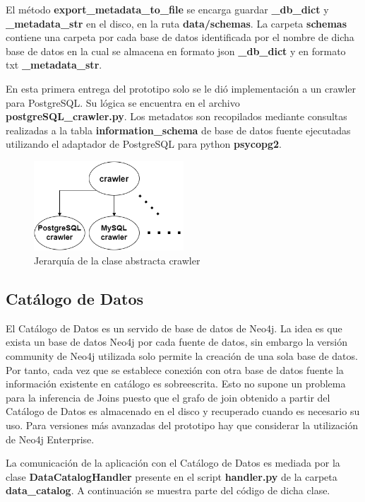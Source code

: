 El m\'etodo \textbf{export\_metadata\_to\_file} se encarga guardar \textbf{\_db\_dict} y \textbf{\_metadata\_str} en el disco, 
en la ruta \textbf{data/schemas}. La carpeta \textbf{schemas} contiene una carpeta por cada base de datos identificada 
por el nombre de dicha base de datos en la cual se almacena en formato json \textbf{\_db\_dict} y en formato txt 
\textbf{\_metadata\_str}.

En esta primera entrega del prototipo solo se le di\'o implementaci\'on a un crawler para PostgreSQL. Su l\'ogica 
se encuentra en el archivo \textbf{postgreSQL\_crawler.py}. Los metadatos son recopilados mediante consultas realizadas
a la tabla \textbf{information\_schema} de base de datos fuente ejecutadas 
utilizando el adaptador de PostgreSQL para python \textbf{psycopg2}.

\begin{figure}[htb]
    \centering
    \includegraphics[width=0.5\textwidth]{Graphics/crawler_class.drawio.png}
    \caption{Jerarqu\'ia de la clase abstracta crawler}
    \label{fig:crawler}
\end{figure}


\subsection{Cat\'alogo de Datos}

El Cat\'alogo de Datos es un servido de base de datos de Neo4j. La idea es que exista un base de datos Neo4j por cada 
fuente de datos, sin embargo la versi\'on community de Neo4j utilizada solo permite la creación de una sola base de datos. 
Por tanto, cada vez que se establece conexi\'on con otra base de datos fuente la informaci\'on existente en cat\'alogo es 
sobreescrita. Esto no supone un problema para la inferencia de Joins puesto que el grafo de join obtenido a partir 
del Cat\'alogo de Datos es almacenado en el disco y recuperado cuando es necesario su uso. Para versiones m\'as avanzadas 
del prototipo hay que considerar la utilizaci\'on de Neo4j Enterprise.

La comunicaci\'on de la aplicaci\'on con el Cat\'alogo de Datos es mediada por la clase \textbf{DataCatalogHandler} 
presente en el script \textbf{handler.py} de la carpeta \textbf{data\_catalog}. A continuación se muestra parte 
del c\'odigo de dicha clase.

